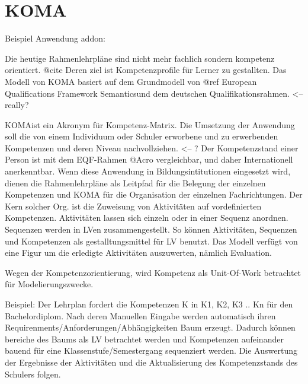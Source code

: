 \documentclass[
12pt,
english,
ngerman,
headsepline,
twoside,
openright,
numbers=noenddot,version=first
]{scrreprt}
\begin{document}



\section{KOMA}{Beispiel Anwendung}
\label{sec:KOMA}
addon: 


Die heutige Rahmenlehrpläne sind nicht mehr fachlich sondern kompetenz orientiert. @cite Deren ziel ist Kompetenzprofile
für Lerner zu gestallten. Das Modell von KOMA basiert auf dem Grundmodell von
@ref \glqq European Qualifications Framework Semantics\grqq und dem deutschen Qualifikationsrahmen. <-- really?

\glqq KOMA\grqq ist ein Akronym für Kompetenz-Matrix. Die Umsetzung der Anwendung soll die von einem Individuum oder Schuler
erworbene und zu erwerbenden Kompetenzen und deren Niveau nachvollziehen. <-- ?
Der Kompetenzstand einer Person ist mit dem EQF-Rahmen @Acro vergleichbar, und daher Internationell anerkenntbar.
Wenn diese Anwendung in Bildungsintitutionen eingesetzt wird, dienen die Rahmenlehrpläne als Leitpfad für die Belegung der einzelnen Kompetenzen
und KOMA für die Organisation der einzelnen Fachrichtungen. Der Kern solcher Org. ist die Zuweisung von Aktivitäten auf vordefinierten Kompetenzen.
Aktivitäten lassen sich einzeln oder in einer Sequenz anordnen. Sequenzen werden in LVen zusammengestellt. So können Aktivitäten, Sequenzen und Kompetenzen
als gestalltungsmittel für LV benutzt. Das Modell verfügt von eine Figur um die erledigte Aktivitäten auszuwerten, nämlich Evaluation.

Wegen der Kompetenzorientierung, wird Kompetenz als Unit-Of-Work betrachtet für Modelierungszwecke.

Beispiel:
Der Lehrplan fordert die Kompetenzen K in K1, K2, K3 .. Kn für den Bachelordiplom. Nach deren Manuellen Eingabe werden automatisch
ihren Requirenments/Anforderungen/Abhängigkeiten Baum erzeugt. Dadurch können bereiche des Baums als LV betrachtet werden und Kompetenzen aufeinander
bauend für eine Klassenstufe/Semestergang sequenziert werden. Die Auswertung der Ergebnisse der Aktivitäten und die Aktualisierung des Kompetenzstands
des Schulers folgen.
\end{document}
